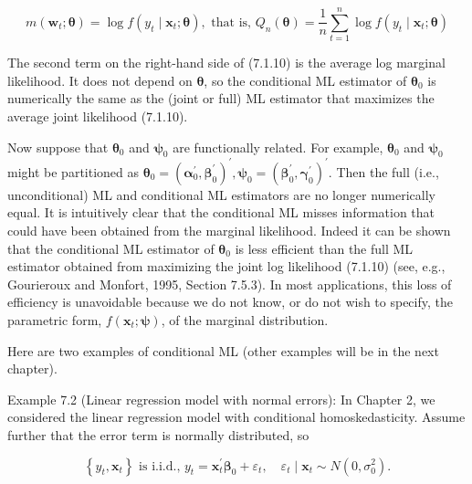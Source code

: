 \documentclass[10pt]{article}
\begin{document}
\begin{equation*}
m\left(\mathbf{w}_{t} ; \boldsymbol{\theta}\right)=\log f\left(y_{t} \mid \mathbf{x}_{t} ; \boldsymbol{\theta}\right), \text { that is, } Q_{n}(\boldsymbol{\theta})=\frac{1}{n} \sum_{t=1}^{n} \log f\left(y_{t} \mid \mathbf{x}_{t} ; \boldsymbol{\theta}\right) \tag{7.1.11}
\end{equation*}


The second term on the right-hand side of (7.1.10) is the average log marginal likelihood. It does not depend on $\boldsymbol{\theta}$, so the conditional ML estimator of $\boldsymbol{\theta}_{0}$ is\\
numerically the same as the (joint or full) ML estimator that maximizes the average joint likelihood (7.1.10).

Now suppose that $\boldsymbol{\theta}_{0}$ and $\boldsymbol{\psi}_{0}$ are functionally related. For example, $\boldsymbol{\theta}_{0}$ and $\boldsymbol{\psi}_{0}$ might be partitioned as $\boldsymbol{\theta}_{0}=\left(\boldsymbol{\alpha}_{0}^{\prime}, \boldsymbol{\beta}_{0}^{\prime}\right)^{\prime}, \boldsymbol{\psi}_{0}=\left(\boldsymbol{\beta}_{0}^{\prime}, \boldsymbol{\gamma}_{0}^{\prime}\right)^{\prime}$. Then the full (i.e., unconditional) ML and conditional ML estimators are no longer numerically equal. It is intuitively clear that the conditional ML misses information that could have been obtained from the marginal likelihood. Indeed it can be shown that the conditional ML estimator of $\boldsymbol{\theta}_{0}$ is less efficient than the full ML estimator obtained from maximizing the joint log likelihood (7.1.10) (see, e.g., Gourieroux and Monfort, 1995, Section 7.5.3). In most applications, this loss of efficiency is unavoidable because we do not know, or do not wish to specify, the parametric form, $f\left(\mathbf{x}_{t} ; \boldsymbol{\psi}\right)$, of the marginal distribution.

Here are two examples of conditional ML (other examples will be in the next chapter).

Example 7.2 (Linear regression model with normal errors): In Chapter 2, we considered the linear regression model with conditional homoskedasticity. Assume further that the error term is normally distributed, so


\begin{equation*}
\left\{y_{t}, \mathbf{x}_{t}\right\} \text { is i.i.d., } y_{t}=\mathbf{x}_{t}^{\prime} \boldsymbol{\beta}_{0}+\varepsilon_{t}, \quad \varepsilon_{t} \mid \mathbf{x}_{t} \sim N\left(0, \sigma_{0}^{2}\right) . \tag{7.1.12}
\end{equation*}
\end{document}
